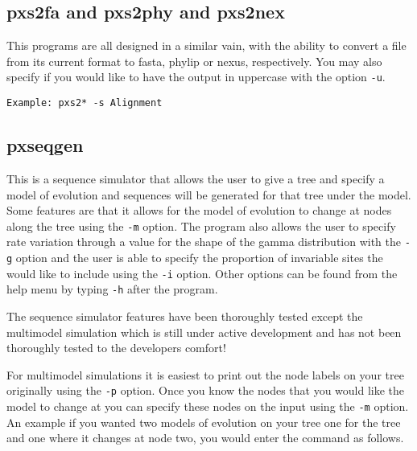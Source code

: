\documentclass[12pt,letterpaper]{memoir}
\begin{document}
\subsection{pxs2fa and pxs2phy and  pxs2nex}

This programs are all designed in a similar vain, with the ability to convert a file from its current format to fasta, phylip or nexus, respectively. You may also specify if you would like to have the output in uppercase with the option \texttt{-u}.


\begin{flushleft}
\begin{verbatim}
Example: pxs2* -s Alignment
\end{verbatim}
\end{flushleft}

\subsection{pxseqgen}

This is a sequence simulator that allows the user to give a tree and specify a model of evolution and sequences will be generated for that tree under the model. Some features are that it allows for the model of evolution to change at nodes along the tree using the \texttt{-m} option. The program also allows the user to specify rate variation through a value for the shape of the gamma distribution with the \texttt{-g} option and the user is able to specify the proportion of invariable sites the would like to include using the \texttt{-i} option. Other options can be found from the help menu by typing \texttt{-h} after the program.

The sequence simulator features have been thoroughly tested except the multimodel simulation which is still under active development and has not been thoroughly tested to the developers comfort!

For multimodel simulations it is easiest to print out the node labels on your tree originally using the \texttt{-p} option. Once you know the nodes that you would like the model to change at you can specify these nodes on the input using the \texttt{-m} option. An example if you wanted two models of evolution on your tree one for the tree and one where it changes at node two, you would enter the command as follows.
\end{document}
